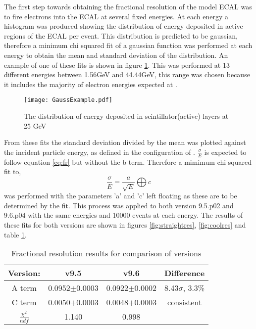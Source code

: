 The first step towards obtaining the fractional resolution of the model ECAL was to fire electrons into the ECAL at several fixed energies.  At each energy a histogram was produced showing the distribution of energy deposited in active regions of the ECAL per event.  This distribution is predicted to be gaussian, therefore a minimum chi squared fit of a gaussian function was performed at each energy to obtain the mean and standard deviation of the distribution. An example of one of these fits is shown in figure \ref{fig:Gauss}.  This was performed at 13 different energies between 1.56GeV and 44.44GeV, this range was chosen because it includes the majority of electron energies expected at \lhcb.

\begin{figure}[h!]
  \centering
  \texttt{[image: GaussExample.pdf]}
  \caption{The distribution of energy deposited in scintillator(active) layers at 25 GeV}
  \label{fig:Gauss}
\end{figure}

From these fits the standard deviation divided by the mean was plotted against the incident particle energy, as defined in the configuration of \geant.  $\frac{\sigma}{E}$ is expected to follow equation \ref{eq:fr} but without the b term. Therefore a mimimum chi squared fit to,
\begin{equation}
  \label{eq:fitfr}
  \frac{\sigma}{E}=\frac{a}{\sqrt{E}}\bigoplus c
\end{equation}
was performed with the parameters 'a' and 'c' left floating as these are to be determined by the fit.  This process was applied to both \geant version 9.5.p02 and 9.6.p04 with the same energies and 10000 events at each energy.  The results of these fits for both \geant versions are shown in figures \ref{fig:straightres}, \ref{fig:coolres} and table \ref{tab:results}.

\begin{table}[h!]
  \centering
  \begin{tabular}{|c|c|c|c|}
      \hline
      Version: & v9.5 & v9.6 & Difference  \\ \hline
      A term    & 0.0952$\pm$0.0003 & 0.0922$\pm$0.0002  & 8.43$\sigma$, 3.3\% \\ \hline
      C term    & 0.0050$\pm$0.0003 & 0.0048$\pm$0.0003 & consistent \\ \hline
      $\frac{\chi^2}{ndf}$   &1.140  & 0.998 &  \\ \hline
  \end{tabular}
  \caption{Fractional resolution results for comparison of \geant versions}
  \label{tab:results}
\end{table}

